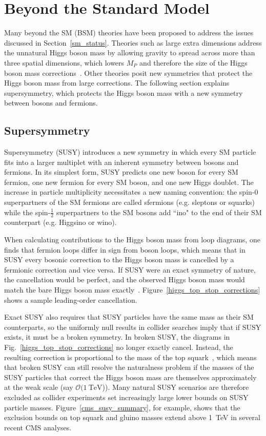 \section{Beyond the Standard Model}
Many beyond the SM (BSM) theories have been proposed to address the issues discussed in Section~\ref{sm_status}. Theories such as large extra dimensions address the unnatural Higgs boson mass by allowing gravity to spread across more than three spatial dimensions, which lowers $M_P$ and therefore the size of the Higgs boson mass corrections~\cite{add}. Other theories posit new symmetries that protect the Higgs boson mass from large corrections. The following section explains supersymmetry, which protects the Higgs boson mass with a new symmetry between bosons and fermions.

\subsection{Supersymmetry}
\label{susy}
Supersymmetry (SUSY) introduces a new symmetry in which every SM particle fits into a larger multiplet with an inherent symmetry between bosons and fermions. In its simplest form, SUSY predicts one new boson for every SM fermion, one new fermion for every SM boson, and one new Higgs doublet. The increase in particle multiplicity necessitates a new naming convention: the spin-0 superpartners of the SM fermions are called sfermions (e.g. sleptons or squarks) while the spin-$\frac{1}{2}$ superpartners to the SM bosons add ``ino" to the end of their SM counterpart (e.g. Higgsino or wino).

When calculating contributions to the Higgs boson mass from loop diagrams, one finds that fermion loops differ in sign from boson loops, which means that in SUSY every bosonic correction to the Higgs boson mass is cancelled by a fermionic correction and vice versa. If SUSY were an exact symmetry of nature, the cancellation would be perfect, and the observed Higgs boson mass would match the bare Higgs boson mass exactly~\cite{susy_primer}. Figure~\ref{higgs_top_stop_corrections} shows a sample leading-order cancellation.



Exact SUSY also requires that SUSY particles have the same mass as their SM counterparts, so the uniformly null results in collider searches imply that if SUSY exists, it must be a broken symmetry. In broken SUSY, the diagrams in Fig.~\ref{higgs_top_stop_corrections} no longer exactly cancel. Instead, the resulting correction is proportional to the mass of the top squark~\cite{craig_susy_run1}, which means that broken SUSY can still resolve the naturalness problem if the masses of the SUSY particles that correct the Higgs boson mass are themselves approximately at the weak scale (say $\mathcal{O}(\SI{1}{\TeV}$)). Many natural SUSY scenarios are therefore excluded as collider experiments set increasingly large lower bounds on SUSY particle masses. Figure~\ref{cms_susy_summary}, for example, shows that the exclusion bounds on top squark and gluino masses extend above \SI{1}{\TeV} in several recent CMS analyses. 

